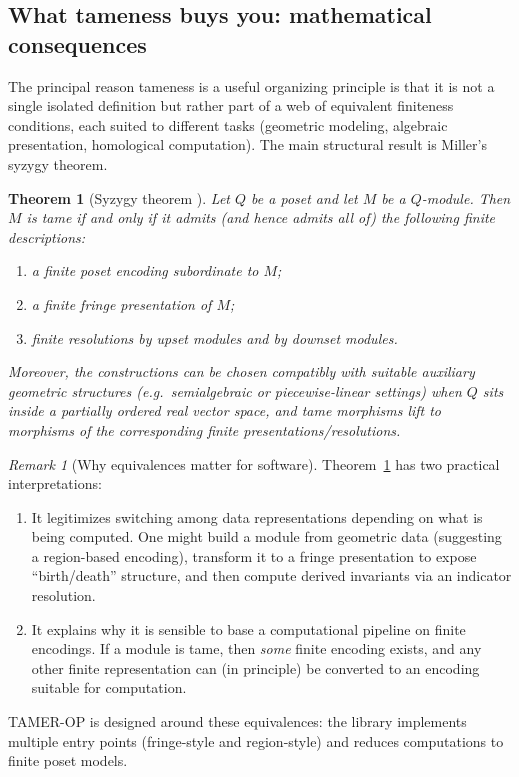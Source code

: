 \documentclass{article}
\newcommand{\<}{\langle}
\renewcommand{\>}{\rangle}
\newtheorem{theorem}{Theorem}
\theoremstyle{definition}
\theoremstyle{remark}
\newtheorem*{remark}{Remark}
\begin{document}
	\subsection{What tameness buys you: mathematical consequences}
	\label{subsec:tame-math}
	
	The principal reason tameness is a useful organizing principle is that it is not a single
	isolated definition but rather part of a web of equivalent finiteness conditions, each
	suited to different tasks (geometric modeling, algebraic presentation, homological
	computation).  The main structural result is Miller's syzygy theorem.
	
	\begin{theorem}[Syzygy theorem {\cite[Thm.~6.12]{Mil20}}]
		\label{thm:syzygy}
		Let $Q$ be a poset and let $M$ be a $Q$-module.  Then $M$ is tame if and only if it
		admits (and hence admits all of) the following finite descriptions:
		\begin{enumerate}[label=(\roman*)]
			\item a finite poset encoding subordinate to $M$;
			\item a finite fringe presentation of $M$;
			\item finite resolutions by upset modules and by downset modules.
		\end{enumerate}
		Moreover, the constructions can be chosen compatibly with suitable auxiliary geometric
		structures (e.g.\ semialgebraic or piecewise-linear settings) when $Q$ sits inside a
		partially ordered real vector space, and tame morphisms lift to morphisms of the
		corresponding finite presentations/resolutions.
	\end{theorem}
	
	\begin{remark}[Why equivalences matter for software]
		\label{rem:equivalences-matter}
		Theorem~\ref{thm:syzygy} has two practical interpretations:
		\begin{enumerate}[label=(\roman*)]
			\item It legitimizes switching among data representations depending on what is being
			computed.  One might build a module from geometric data (suggesting a region-based
			encoding), transform it to a fringe presentation to expose ``birth/death'' structure,
			and then compute derived invariants via an indicator resolution.
			\item It explains why it is sensible to base a computational pipeline on finite encodings.
			If a module is tame, then \emph{some} finite encoding exists, and any other finite
			representation can (in principle) be converted to an encoding suitable for computation.
		\end{enumerate}
		TAMER-OP is designed around these equivalences: the library implements multiple entry points
		(fringe-style and region-style) and reduces computations to finite poset models.
	\end{remark}
	
\end{document}
